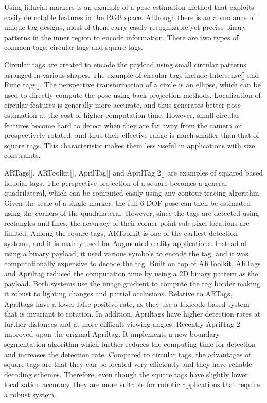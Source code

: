	Using fiducial markers is an example of a pose estimation method that exploits easily detectable features in the RGB space. Although there is an abundance of unique tag designs, most of them carry easily recognizable yet precise binary patterns in the inner region to encode information. There are two types of common tags: circular tags and square tags. 
	
	Circular tags are created to encode the payload using small circular patterns arranged in various shapes. The example of circular tags include Intersense[] and Rune tags[]. The perspective transformation of a circle is an ellipse, which can be used to directly compute the pose using back projection methods. Localization of circular features is generally more accurate, and thus generates better pose estimation at the cost of higher computation time. However, small circular features become hard to detect when they are far away from the camera or prospectively rotated, and thus their effective range is much smaller than that of square tags. This characteristic makes them less useful in applications with size constraints. 
	
	ARTags[], ARToolkit[], AprilTag[] and AprilTag 2[] are examples of squared based fiducial tags. The perspective projection of a square becomes a general quadrilateral, which can be computed easily using any contour tracing algorithm. Given the scale of a single marker, the full 6-DOF pose can then be estimated using the corners of the quadrilateral. However, since the tags are detected using rectangles and lines, the accuracy of their corner point sub-pixel locations are limited. Among the square tags, ARToolkit is one of the earliest detection systems, and it is mainly used for Augmented reality applications. Instead of using a binary payload, it used various symbols to encode the tag, and it was computationally expensive to decode the tag. Built on top of ARToolkit, ARTags and Apriltag reduced the computation time by using a 2D binary pattern as the payload. Both systems use the image gradient to compute the tag border making it robust to lighting changes and partial occlusions. Relative to ARTags, Apriltags have a lower false positive rate, as they use a lexicode-based system that is invariant to rotation. In addition, Apriltags have higher detection rates at further distances and at more difficult viewing angles. Recently AprilTag 2 improved upon the original Apriltag. It implements a new boundary segmentation algorithm which further reduces the computing time for detection and increases the detection rate. Compared to circular tags, the advantages of square tags are that they can be located very efficiently and they have reliable decoding schemes. Therefore, even though the square tags have slightly lower localization accuracy, they are more suitable for robotic applications that require a robust system.